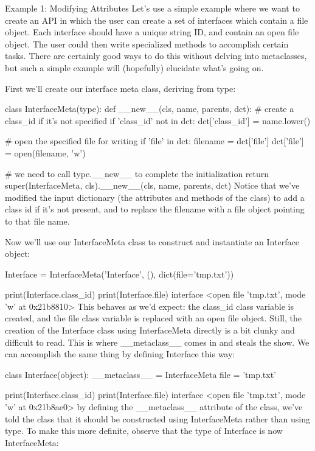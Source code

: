 Example 1: Modifying Attributes
Let's use a simple example where we want to create an API in which the user can create a set of interfaces which contain a file object. Each interface should have a unique string ID, and contain an open file object. The user could then write specialized methods to accomplish certain tasks. There are certainly good ways to do this without delving into metaclasses, but such a simple example will (hopefully) elucidate what's going on.

First we'll create our interface meta class, deriving from type:

class InterfaceMeta(type):
    def __new__(cls, name, parents, dct):
        # create a class_id if it's not specified
        if 'class_id' not in dct:
            dct['class_id'] = name.lower()

        # open the specified file for writing
        if 'file' in dct:
            filename = dct['file']
            dct['file'] = open(filename, 'w')

        # we need to call type.__new__ to complete the initialization
        return super(InterfaceMeta, cls).__new__(cls, name, parents, dct)
Notice that we've modified the input dictionary (the attributes and methods of the class) to add a class id if it's not present, and to replace the filename with a file object pointing to that file name.

Now we'll use our InterfaceMeta class to construct and instantiate an Interface object:

Interface = InterfaceMeta('Interface', (), dict(file='tmp.txt'))

print(Interface.class_id)
print(Interface.file)
interface
<open file 'tmp.txt', mode 'w' at 0x21b8810>
This behaves as we'd expect: the class_id class variable is created, and the file class variable is replaced with an open file object. Still, the creation of the Interface class using InterfaceMeta directly is a bit clunky and difficult to read. This is where __metaclass__ comes in and steals the show. We can accomplish the same thing by defining Interface this way:

class Interface(object):
    __metaclass__ = InterfaceMeta
    file = 'tmp.txt'

print(Interface.class_id)
print(Interface.file)
interface
<open file 'tmp.txt', mode 'w' at 0x21b8ae0>
by defining the __metaclass__ attribute of the class, we've told the class that it should be constructed using InterfaceMeta rather than using type. To make this more definite, observe that the type of Interface is now InterfaceMeta:


